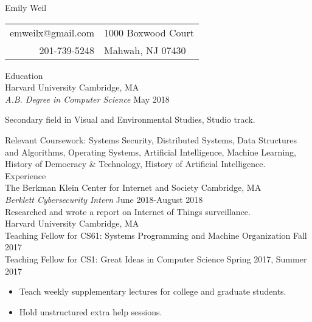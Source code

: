 \documentclass{article}
\begin{document}
\begin{multicols}{2}
\begin{flushleft}
	
	\textsf{\Huge Emily Weil} 
\end{flushleft}

\columnbreak
\begin{flushright}
	\begin{tabular}{r | l}
	emweilx@gmail.com & 1000 Boxwood Court \\
	201-739-5248 & Mahwah, NJ 07430 \\
	\end{tabular}
\end{flushright}
\end{multicols}

\hfill \break

{\parindent0pt
\textsf{\Large Education}\\

Harvard University \hfill Cambridge, MA \\ 
\textit{A.B. Degree in Computer Science} \hfill May 2018 

Secondary field in Visual and Environmental Studies, Studio track.

Relevant Coursework: Systems Security, Distributed Systems, Data Structures and Algorithms, Operating Systems, Artificial Intelligence, Machine Learning, History of Democracy & Technology, History of Artificial Intelligence. \\ 

\textsf{\large Experience}\\

The Berkman Klein Center for Internet and Society \hfill Cambridge, MA\\
\textit{Berklett Cybersecurity Intern} \hfill June 2018-August 2018\\
Researched and wrote a report on Internet of Things surveillance. \\
  
Harvard University \hfill Cambridge, MA\\
Teaching Fellow for CS61: Systems Programming and Machine Organization \hfill Fall 2017\\
Teaching Fellow for CS1: Great Ideas in Computer Science \hfill Spring 2017, Summer 2017	
\begin{itemize} \itemsep -2pt
	\item Teach weekly supplementary lectures for college and graduate students.
	\item Hold unstructured extra help sessions.
\end{itemize}

}
\end{document}
